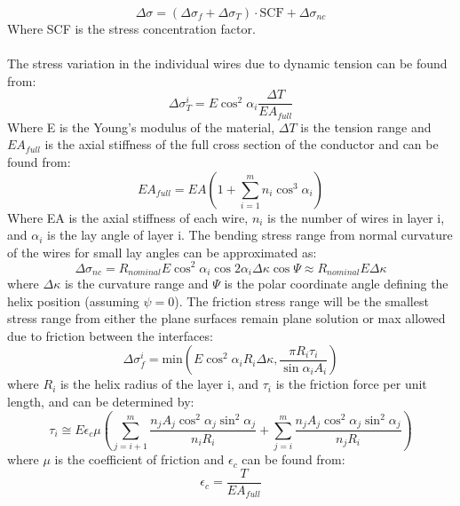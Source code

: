 \begin{equation}
    \Delta \sigma = (\Delta \sigma_f + \Delta \sigma_{T})\cdot \text{SCF} + \Delta \sigma_{nc}
    \label{eq:stressvariationred}
\end{equation}Where SCF is the stress concentration factor. \\\\The stress variation in the individual wires due to dynamic tension can be found from:
\begin{equation}
    \Delta \sigma_T^i = E \cos^2 \alpha_i \frac{\Delta T}{E A_{full}} 
    \label{eq:sigmaT}
\end{equation}
\noindent Where E is the Young's modulus of the material, $\Delta T$ is the tension range and $EA_{full}$  is the axial stiffness of the full cross section of the conductor and can be found from:
\begin{equation}
    EA_{full}=EA \left( 1+\sum_{i=1}^m n_i \cos^3\alpha_i \right)
\end{equation}
\noindent Where EA is the axial stiffness of each wire, $n_i$ is the number of wires in layer i, and $\alpha_i$ is the lay angle of layer i. \newline
\newline
The bending stress range from normal curvature of the wires for small lay angles can be approximated as:
\begin{equation}
    \Delta \sigma_{nc} = R_{nominal} E \cos^2 \alpha_i \cos2 \alpha_i \Delta \kappa \cos \Psi \approx R_{nominal}E \Delta \kappa
\end{equation}
where $\Delta \kappa$ is the curvature range and $\Psi$ is the polar coordinate angle defining the helix position (assuming $\psi=0$). \newline
\newline
The friction stress range will be the smallest stress range from either the plane surfaces remain plane solution or max allowed due to friction between the interfaces:
\begin{equation}
    \Delta \sigma_f^i =\text{min}\left(E \cos^2 \alpha_i R_i \Delta \kappa , \frac{\pi R_i \tau_i}{\sin \alpha_i A_i}\right)
\end{equation}
where $R_i$ is the helix radius of the layer i, and $\tau_i$ is the friction force per unit length, and can be determined by:
\begin{equation}
    \tau_i \cong E \epsilon_c \mu \left( \sum_{j=i+1}^m \frac{n_j A_j \cos^2 \alpha_j \sin^2 \alpha_j }{n_i R_i} + \sum_{j=i}^m \frac{n_j A_j \cos^2 \alpha_j  \sin^2 \alpha_j}{n_j R_i}\right)
\end{equation}
where $\mu$ is the coefficient of friction and $\epsilon_c$ can be found from:
\begin{equation}
    \epsilon_c =\frac{T}{EA_{full}}
    \label{eq:stressvariation2}
\end{equation}